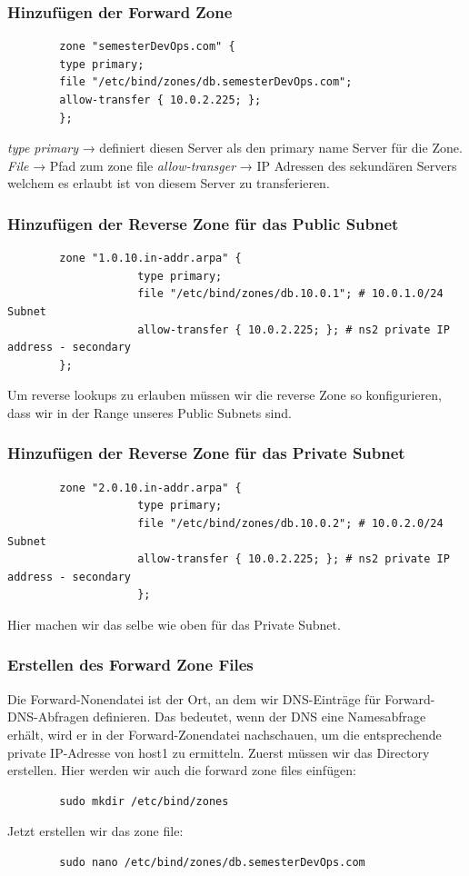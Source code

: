 \documentclass[a4paper,12pt]{article}
\begin{document}
\subsubsection{Hinzufügen der Forward Zone}
\begin{verbatim}
		zone "semesterDevOps.com" {
		type primary;
		file "/etc/bind/zones/db.semesterDevOps.com"; 
		allow-transfer { 10.0.2.225; };
		};
\end{verbatim}
\textit{type primary} → definiert diesen Server als den primary name Server für die Zone.
\textit{File} → Pfad zum zone file
\textit{allow-transger} → IP Adressen des sekundären Servers welchem es erlaubt ist von diesem Server zu transferieren.


\subsubsection{Hinzufügen der Reverse Zone für das Public Subnet}
\begin{verbatim}
		zone "1.0.10.in-addr.arpa" {
					type primary;
					file "/etc/bind/zones/db.10.0.1"; # 10.0.1.0/24 Subnet
					allow-transfer { 10.0.2.225; }; # ns2 private IP address - secondary
		};
\end{verbatim}
Um reverse lookups zu erlauben müssen wir die reverse Zone so konfigurieren, dass wir in der Range unseres Public Subnets sind.


\subsubsection{Hinzufügen der Reverse Zone für das Private Subnet}
\begin{verbatim}
		zone "2.0.10.in-addr.arpa" {
					type primary;
					file "/etc/bind/zones/db.10.0.2"; # 10.0.2.0/24 Subnet
					allow-transfer { 10.0.2.225; }; # ns2 private IP address - secondary
					};
\end{verbatim}
Hier machen wir das selbe wie oben für das Private Subnet.

\subsubsection{Erstellen des Forward Zone Files}
Die Forward-Nonendatei ist der Ort, an dem wir DNS-Einträge für Forward-DNS-Abfragen definieren. 
Das bedeutet, wenn der DNS eine Namesabfrage erhält, wird er in der Forward-Zonendatei nachschauen, um die entsprechende private IP-Adresse von host1 zu ermitteln.
Zuerst müssen wir das Directory erstellen. Hier werden wir auch die forward zone files einfügen:
\begin{verbatim}
		sudo mkdir /etc/bind/zones
\end{verbatim}
Jetzt erstellen wir das zone file:
\begin{verbatim}
		sudo nano /etc/bind/zones/db.semesterDevOps.com
\end{verbatim}
\end{document}
